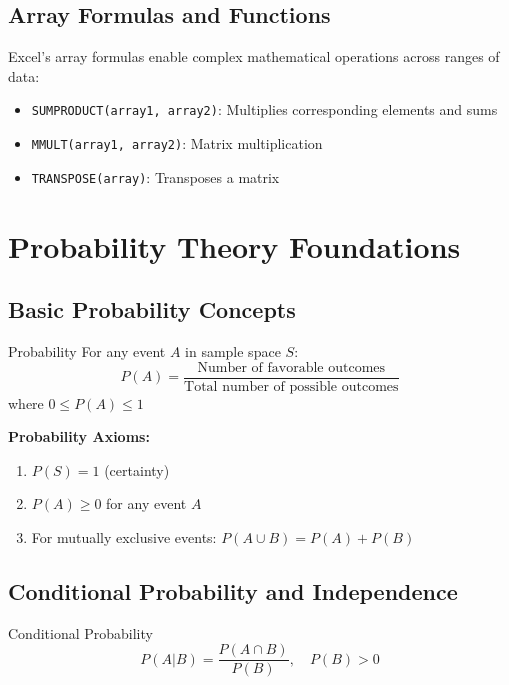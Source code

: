 \documentclass[12pt,a4paper]{book}
\begin{document}
\subsection{Array Formulas and Functions}

Excel's array formulas enable complex mathematical operations across ranges of data:

\begin{itemize}
    \item \texttt{SUMPRODUCT(array1, array2)}: Multiplies corresponding elements and sums
    \item \texttt{MMULT(array1, array2)}: Matrix multiplication
    \item \texttt{TRANSPOSE(array)}: Transposes a matrix
\end{itemize}

\section{Probability Theory Foundations}

\subsection{Basic Probability Concepts}

\begin{definition}{Probability}
For any event $A$ in sample space $S$:
\[
P(A) = \frac{\text{Number of favorable outcomes}}{\text{Total number of possible outcomes}}
\]
where $0 \leq P(A) \leq 1$
\end{definition}

\textbf{Probability Axioms:}
\begin{enumerate}
    \item $P(S) = 1$ (certainty)
    \item $P(A) \geq 0$ for any event $A$
    \item For mutually exclusive events: $P(A \cup B) = P(A) + P(B)$
\end{enumerate}

\subsection{Conditional Probability and Independence}

\begin{definition}{Conditional Probability}
\[
P(A|B) = \frac{P(A \cap B)}{P(B)}, \quad P(B) > 0
\]
\end{definition}
\end{document}
